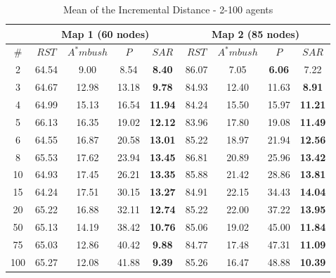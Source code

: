 \begin{table}[h]
\caption{Mean of the Incremental Distance - 2-100 agents}
\begin{center}

\begin{tabular}{|c|c|c|c|c||c|c|c|c|}
\hline
 & 
\multicolumn{4}{|c||}{\textbf{Map 1 (60 nodes)}} &
\multicolumn{4}{|c|}{\textbf{Map 2 (85 nodes)}}\\
\hline
\# & $RST$ & $A^*mbush$ & $P$ & $SAR$ &
	 $RST$ & $A^*mbush$ & $P$ & $SAR$\\
\hline
 2 & 64.54 & 9.00 & 8.54 & \textbf{8.40}   
   & 86.07 & 7.05 & \textbf{6.06} & 7.22\\
 3 & 64.67 & 12.98 & 13.18 & \textbf{9.78}  
   & 84.93 & 12.40 & 11.63 & \textbf{8.91}\\
 4 & 64.99 & 15.13 & 16.54 & \textbf{11.94}
   & 84.24 & 15.50 & 15.97 & \textbf{11.21}\\
 5 & 66.13 & 16.35 & 19.02 & \textbf{12.12}
   & 83.96 & 17.80 & 19.08 & \textbf{11.49}\\
 6 & 64.55 & 16.87 & 20.58 & \textbf{13.01}
   & 85.22 & 18.97 & 21.94 & \textbf{12.56}\\
 8 & 65.53 & 17.62 & 23.94 & \textbf{13.45}
   & 86.81 & 20.89 & 25.96 & \textbf{13.42}\\
10 & 64.93 & 17.45 & 26.21 & \textbf{13.35}
   & 85.88 & 21.42 & 28.86 & \textbf{13.81}\\
15 & 64.24 & 17.51 & 30.15 & \textbf{13.27}
   & 84.91 & 22.15 & 34.43 & \textbf{14.04}\\
20 & 65.22 & 16.88 & 32.11 & \textbf{12.74}
   & 85.22 & 22.00 & 37.22 & \textbf{13.95}\\
50 & 65.13 & 14.19 & 38.42 & \textbf{10.76}
   & 85.06 & 19.02 & 45.00 & \textbf{11.84}\\
75 & 65.03 & 12.86 & 40.42 & \textbf{9.88}
   & 84.77 & 17.48 & 47.31 & \textbf{11.09}\\
100 & 65.27 & 12.08 & 41.88 & \textbf{9.39}
    & 85.26 & 16.47 & 48.88 & \textbf{10.39}\\
\hline
\end{tabular}

\label{incr}
\end{center}
\end{table}

